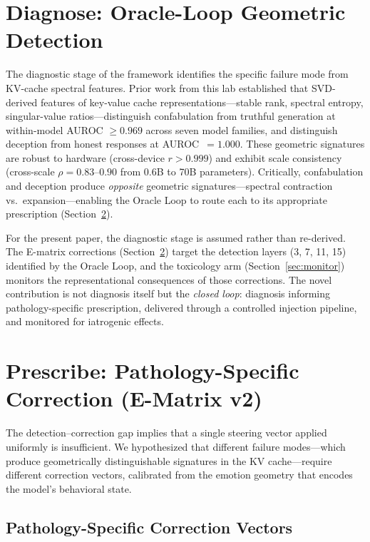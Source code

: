 \documentclass[11pt,a4paper]{article}
\begin{document}
\section{Diagnose: Oracle-Loop Geometric Detection}
\label{sec:diagnose}

The diagnostic stage of the framework identifies the specific failure mode
from KV-cache spectral features. Prior work from this lab established that
SVD-derived features of key-value cache representations---stable rank, spectral
entropy, singular-value ratios---distinguish confabulation from truthful
generation at within-model AUROC $\geq 0.969$ across seven model families, and
distinguish deception from honest responses at AUROC~$= 1.000$. These
geometric signatures are robust to hardware (cross-device $r > 0.999$) and
exhibit scale consistency (cross-scale $\rho = 0.83$--$0.90$ from 0.6B to 70B
parameters). Critically, confabulation and deception produce \emph{opposite}
geometric signatures---spectral contraction vs.\ expansion---enabling the
Oracle Loop to route each to its appropriate prescription
(Section~\ref{sec:prescribe}).

For the present paper, the diagnostic stage is assumed rather than re-derived.
The E-matrix corrections (Section~\ref{sec:prescribe}) target the detection
layers (3, 7, 11, 15) identified by the Oracle Loop, and the toxicology arm
(Section~\ref{sec:monitor}) monitors the representational consequences of
those corrections. The novel contribution is not diagnosis itself but the
\emph{closed loop}: diagnosis informing pathology-specific prescription,
delivered through a controlled injection pipeline, and monitored for
iatrogenic effects.

\section{Prescribe: Pathology-Specific Correction (E-Matrix v2)}
\label{sec:prescribe}

The detection--correction gap implies that a single steering vector applied
uniformly is insufficient. We hypothesized that different failure modes---which
produce geometrically distinguishable signatures in the KV
cache---require different correction vectors, calibrated from the emotion
geometry that encodes the model's behavioral state.

\subsection{Pathology-Specific Correction Vectors}
\end{document}
